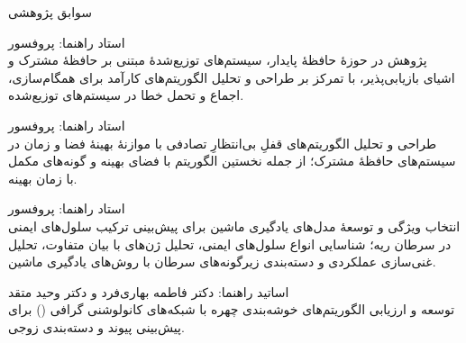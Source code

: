 \documentclass[11pt]{article}
\begin{document}
\begin{faSection}{سوابق پژوهشی}

استاد راهنما: پروفسور \\
پژوهش در حوزۀ حافظۀ پایدار، سیستم‌های توزیع‌شدۀ مبتنی بر حافظۀ مشترک و اشیای بازیابی‌پذیر، با تمرکز بر طراحی و تحلیل الگوریتم‌های کارآمد برای همگام‌سازی، اجماع و تحمل خطا در سیستم‌های توزیع‌شده.

\vspace{0.5em}
استاد راهنما: پروفسور \\
طراحی و تحلیل الگوریتم‌های قفلِ بی‌انتظارِ تصادفی با موازنۀ بهینۀ فضا و زمان در سیستم‌های حافظۀ مشترک؛ از جمله نخستین الگوریتم با فضای بهینه و گونه‌های مکمل با زمان بهینه.

\vspace{0.5em}
استاد راهنما: پروفسور \\
انتخاب ویژگی و توسعۀ مدل‌های یادگیری ماشین برای پیش‌بینی ترکیب سلول‌های ایمنی در سرطان ریه؛ شناسایی انواع سلول‌های ایمنی، تحلیل ژن‌های با بیان متفاوت، تحلیل غنی‌سازی عملکردی و دسته‌بندی زیرگونه‌های سرطان با روش‌های یادگیری ماشین.

\vspace{0.5em}
اساتید راهنما: دکتر فاطمه بهاری‌فرد و دکتر وحید متقد\\
توسعه و ارزیابی الگوریتم‌های خوشه‌بندی چهره با شبکه‌های کانولوشنی گرافی () برای پیش‌بینی پیوند و دسته‌بندی زوجی.

\end{faSection}
\end{document}
